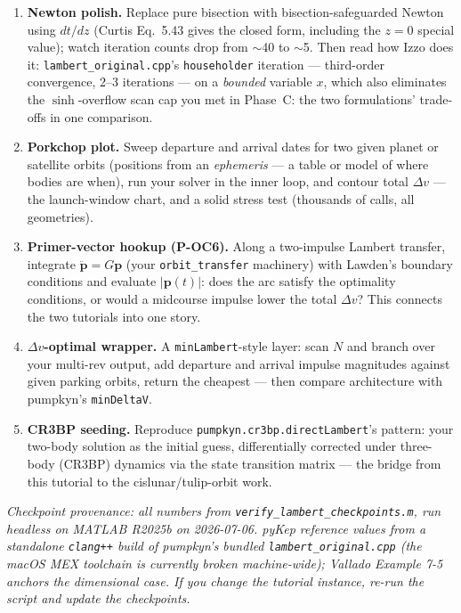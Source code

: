 \documentclass[11pt,letterpaper]{article}
\begin{document}
\begin{enumerate}[leftmargin=*]
\item \textbf{Newton polish.} Replace pure bisection with
  bisection-safeguarded Newton using $dt/dz$ (Curtis Eq.~5.43 gives the
  closed form, including the $z = 0$ special value); watch iteration
  counts drop from $\sim$40 to $\sim$5. Then read how Izzo does it:
  \texttt{lambert\_original.cpp}'s \texttt{householder} iteration ---
  third-order convergence, 2--3 iterations --- on a \emph{bounded}
  variable $x$, which also eliminates the $\sinh$-overflow scan cap you
  met in Phase~C: the two formulations' trade-offs in one comparison.
\item \textbf{Porkchop plot.} Sweep departure and arrival dates for two
  given planet or satellite orbits (positions from an \emph{ephemeris} ---
  a table or model of where bodies are when), run your solver in the inner
  loop, and contour total $\Delta v$ --- the launch-window chart, and a
  solid stress test (thousands of calls, all geometries).
\item \textbf{Primer-vector hookup (P-OC6).} Along a two-impulse Lambert
  transfer, integrate $\ddot{\mathbf p} = G\mathbf p$ (your
  \texttt{orbit\_transfer} machinery) with Lawden's boundary conditions
  and evaluate $|\mathbf p(t)|$: does the arc satisfy the optimality
  conditions, or would a midcourse impulse lower the total $\Delta v$?
  This connects the two tutorials into one story.
\item \textbf{$\Delta v$-optimal wrapper.} A \texttt{minLambert}-style
  layer: scan $N$ and branch over your multi-rev output, add departure
  and arrival impulse magnitudes against given parking orbits, return the
  cheapest --- then compare architecture with pumpkyn's
  \texttt{minDeltaV}.
\item \textbf{CR3BP seeding.} Reproduce
  \texttt{pumpkyn.cr3bp.directLambert}'s pattern: your two-body solution
  as the initial guess, differentially corrected under three-body (CR3BP)
  dynamics via the state transition matrix --- the bridge from this
  tutorial to the cislunar/tulip-orbit work.
\end{enumerate}

\bigskip
\noindent\emph{Checkpoint provenance: all numbers from
\texttt{verify\_lambert\_checkpoints.m}, run headless on MATLAB R2025b on
2026-07-06. pyKep reference values from a standalone \texttt{clang++}
build of pumpkyn's bundled \texttt{lambert\_original.cpp} (the macOS MEX
toolchain is currently broken machine-wide); Vallado Example 7-5 anchors
the dimensional case. If you change the tutorial instance, re-run the
script and update the checkpoints.}
\end{document}
